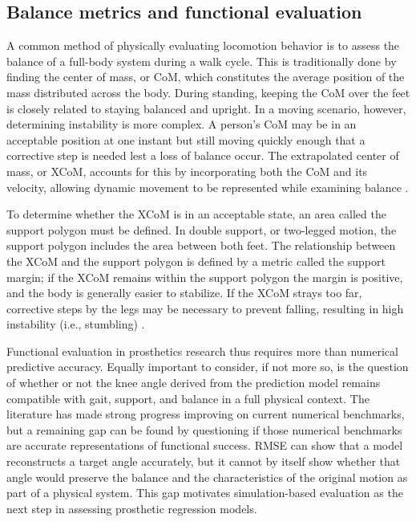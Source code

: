 \documentclass[referee,lineno,pdflatex,sn-vancouver-num]{sn-jnl}
\begin{document}
\subsection{Balance metrics and functional evaluation}
A common method of physically evaluating locomotion behavior is to assess the balance of a full-body system during a walk cycle. This is traditionally done by finding the center of mass, or CoM, which constitutes the average position of the mass distributed across the body. During standing, keeping the CoM over the feet is closely related to staying balanced and upright. In a moving scenario, however, determining instability is more complex. A person's CoM may be in an acceptable position at one instant but still moving quickly enough that a corrective step is needed lest a loss of balance occur. The extrapolated center of mass, or XCoM, accounts for this by incorporating both the CoM and its velocity, allowing dynamic movement to be represented while examining balance \cite{hof2005,hof2008}.

To determine whether the XCoM is in an acceptable state, an area called the support polygon must be defined. In double support, or two-legged motion, the support polygon includes the area between both feet. The relationship between the XCoM and the support polygon is defined by a metric called the support margin; if the XCoM remains within the support polygon the margin is positive, and the body is generally easier to stabilize. If the XCoM strays too far, corrective steps by the legs may be necessary to prevent falling, resulting in high instability (i.e., stumbling) \cite{hof2005,hof2008}.

Functional evaluation in prosthetics research thus requires more than numerical predictive accuracy. Equally important to consider, if not more so, is the question of whether or not the knee angle derived from the prediction model remains compatible with gait, support, and balance in a full physical context. The literature has made strong progress improving on current numerical benchmarks, but a remaining gap can be found by questioning if those numerical benchmarks are accurate representations of functional success. RMSE can show that a model reconstructs a target angle accurately, but it cannot by itself show whether that angle would preserve the balance and the characteristics of the original motion as part of a physical system. This gap motivates simulation-based evaluation as the next step in assessing prosthetic regression models.
\end{document}
